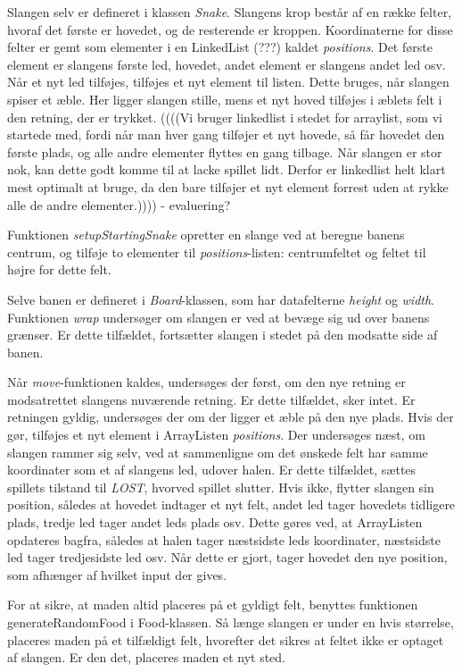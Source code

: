 \documentclass{report}
\begin{document}
Slangen selv er defineret i klassen \textit{Snake}. Slangens krop består af en række felter, hvoraf det første er hovedet, og de resterende er kroppen. Koordinaterne for disse felter er gemt som elementer i en LinkedList (???) kaldet \textit{positions}. Det første element er slangens første led, hovedet, andet element er slangens andet led osv. Når et nyt led tilføjes, tilføjes et nyt element til listen. Dette bruges, når slangen spiser et æble. Her ligger slangen stille, mens et nyt hoved tilføjes i æblets felt i den retning, der er trykket. 
((((Vi bruger linkedlist i stedet for arraylist, som vi startede med, fordi når man hver gang tilføjer et nyt hovede, så får hovedet den første plads, og alle andre elementer flyttes en gang tilbage. Når slangen er stor nok, kan dette godt komme til at lacke spillet lidt. Derfor er linkedlist helt klart mest optimalt at bruge, da den bare tilføjer et nyt element forrest uden at rykke alle de andre elementer.)))) - evaluering?

Funktionen \textit{setupStartingSnake} opretter en slange ved at beregne banens centrum, og tilføje to elementer til \textit{positions}-listen: centrumfeltet og feltet til højre for dette felt.

Selve banen er defineret i \textit{Board}-klassen, som har datafelterne \textit{height} og \textit{width}. Funktionen \textit{wrap} undersøger om slangen er ved at bevæge sig ud over banens grænser. Er dette tilfældet, fortsætter slangen i stedet på den modsatte side af banen.

Når \textit{move}-funktionen kaldes, undersøges der først, om den nye retning er modsatrettet slangens nuværende retning. Er dette tilfældet, sker intet. Er retningen gyldig, undersøges der om der ligger et æble på den nye plads. Hvis der gør, tilføjes et nyt element i ArrayListen \textit{positions}.
Der undersøges næst, om slangen rammer sig selv, ved at sammenligne om det ønskede felt har samme koordinater som et af slangens led, udover halen. Er dette tilfældet, sættes spillets tilstand til \textit{LOST}, hvorved spillet slutter. Hvis ikke, flytter slangen sin position, således at hovedet indtager et nyt felt, andet led tager hovedets tidligere plads, tredje led tager andet leds plads osv. Dette gøres ved, at ArrayListen opdateres bagfra, således at halen tager næstsidste leds koordinater, næstsidste led tager tredjesidste led osv. Når dette er gjort, tager hovedet den nye position, som afhænger af hvilket input der gives.

For at sikre, at maden altid placeres på et gyldigt felt, benyttes funktionen generateRandomFood i Food-klassen. Så længe slangen er under en hvis størrelse, placeres maden på et tilfældigt felt, hvorefter det sikres at feltet ikke er optaget af slangen. Er den det, placeres maden et nyt sted.
\end{document}
